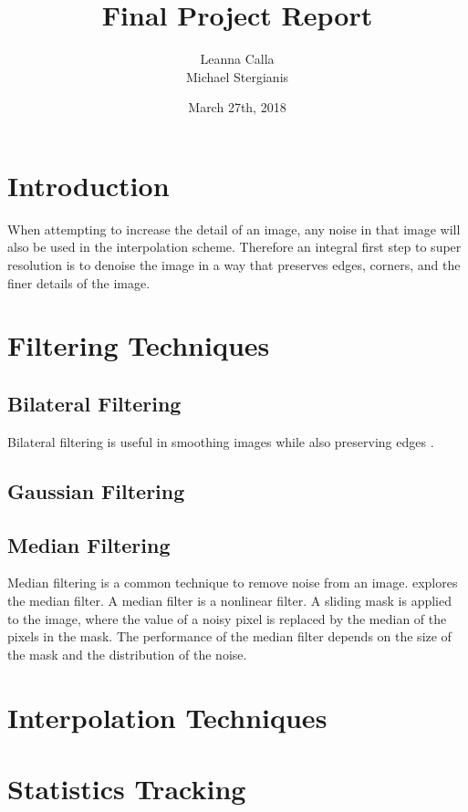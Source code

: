 \documentclass{article}
\title{Final Project Report}
\author{Leanna Calla \\ Michael Stergianis}
\date{March 27th, 2018}
\begin{document}
\maketitle
%
\section{Introduction}
\begin{flushleft}
  When attempting to increase the detail of an image, any noise in
  that image will also be used in the interpolation scheme. Therefore
  an integral first step to super resolution is to denoise the image
  in a way that preserves edges, corners, and the finer details of the
  image.
\end{flushleft}
%
\section{Filtering Techniques}
\subsection{Bilateral Filtering}
Bilateral filtering is useful in smoothing images while also
preserving edges \cite{Paris}.
\subsection{Gaussian Filtering}
\subsection{Median Filtering}
%
\begin{flushleft}
  Median filtering is a common technique to remove noise from an
  image. \cite{Med} explores the median filter. A median filter is a
  nonlinear filter. A sliding mask is applied to the image, where the
  value of a noisy pixel is replaced by the median of the pixels in
  the mask. The performance of the median filter depends on the size
  of the mask and the distribution of the noise.
\end{flushleft}
%
\section{Interpolation Techniques}
%
\section{Statistics Tracking}
\newpage
%
\printbibliography
\end{document}
